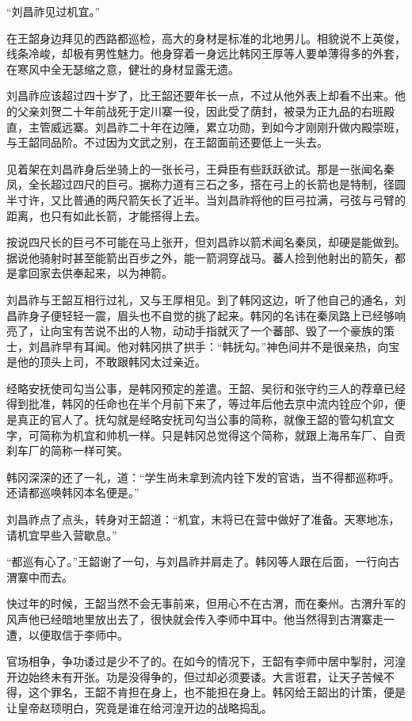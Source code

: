 “刘昌祚见过机宜。”

在王韶身边拜见的西路都巡检，高大的身材是标准的北地男儿。相貌说不上英俊，线条冷峻，却极有男性魅力。他身穿着一身远比韩冈王厚等人要单薄得多的外套，在寒风中全无瑟缩之意，健壮的身材显露无遗。

刘昌祚应该超过四十岁了，比王韶还要年长一点，不过从他外表上却看不出来。他的父亲刘贺二十年前战死于定川寨一役，因此受了荫封，被录为正九品的右班殿直，主管威远寨。刘昌祚二十年在边陲，累立功勋，到如今才刚刚升做内殿崇班，与王韶同品阶。不过因为文武之别，在王韶面前还要低上一头去。

见着架在刘昌祚身后坐骑上的一张长弓，王舜臣有些跃跃欲试。那是一张闻名秦凤，全长超过四尺的巨弓。据称力道有三石之多，搭在弓上的长箭也是特制，径圆半寸许，又比普通的两尺箭矢长了近半。当刘昌祚将他的巨弓拉满，弓弦与弓臂的距离，也只有如此长箭，才能搭得上去。

按说四尺长的巨弓不可能在马上张开，但刘昌祚以箭术闻名秦凤，却硬是能做到。据说他骑射时甚至能箭出百步之外，能一箭洞穿战马。蕃人捡到他射出的箭矢，都是拿回家去供奉起来，以为神箭。

刘昌祚与王韶互相行过礼，又与王厚相见。到了韩冈这边，听了他自己的通名，刘昌祚身子便轻轻一震，眉头也不自觉的挑了起来。韩冈的名讳在秦凤路上已经够响亮了，让向宝有苦说不出的人物，动动手指就灭了一个蕃部、毁了一个豪族的策士，刘昌祚早有耳闻。他对韩冈拱了拱手：“韩抚勾。”神色间并不是很亲热，向宝是他的顶头上司，不敢跟韩冈太过亲近。

经略安抚使司勾当公事，是韩冈预定的差遣。王韶、吴衍和张守约三人的荐章已经得到批准，韩冈的任命也在半个月前下来了，等过年后他去京中流内铨应个卯，便是真正的官人了。抚勾就是经略安抚司勾当公事的简称，就像王韶的管勾机宜文字，可简称为机宜和帅机一样。只是韩冈总觉得这个简称，就跟上海吊车厂、自贡刹车厂的简称一样可笑。

韩冈深深的还了一礼，道：“学生尚未拿到流内铨下发的官诰，当不得都巡称呼。还请都巡唤韩冈本名便是。”

刘昌祚点了点头，转身对王韶道：“机宜，末将已在营中做好了准备。天寒地冻，请机宜早些入营歇息。”

“都巡有心了。”王韶谢了一句，与刘昌祚并肩走了。韩冈等人跟在后面，一行向古渭寨中而去。

快过年的时候，王韶当然不会无事前来，但用心不在古渭，而在秦州。古渭升军的风声他已经暗地里放出去了，很快就会传入李师中耳中。他当然得到古渭寨走一遭，以便取信于李师中。

官场相争，争功诿过是少不了的。在如今的情况下，王韶有李师中居中掣肘，河湟开边始终未有开张。功是没得争的，但过却必须要诿。大言诳君，让天子苦候不得，这个罪名，王韶不肯担在身上，也不能担在身上。韩冈给王韶出的计策，便是让皇帝赵顼明白，究竟是谁在给河湟开边的战略捣乱。

